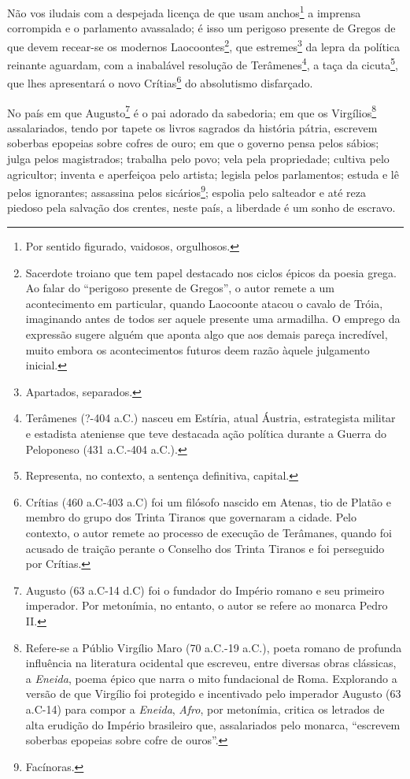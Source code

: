 Não vos iludais com a despejada licença de que usam anchos\footnote{
  Por sentido figurado, vaidosos, orgulhosos.} a imprensa corrompida e o
parlamento avassalado; é isso um perigoso presente de Gregos de que
devem recear-se os modernos Laocoontes\footnote{Sacerdote troiano que
  tem papel destacado nos ciclos épicos da poesia grega. Ao falar do
  ``perigoso presente de Gregos'', o autor remete a um acontecimento em
  particular, quando Laocoonte atacou o cavalo de Tróia, imaginando
  antes de todos ser aquele presente uma armadilha. O emprego da
  expressão sugere alguém que aponta algo que aos demais pareça
  incredível, muito embora os acontecimentos futuros deem razão àquele
  julgamento inicial.}, que estremes\footnote{Apartados, separados.}
da lepra da política reinante aguardam, com a inabalável resolução de
Terâmenes\footnote{Terâmenes (?-404 a.C.) nasceu em Estíria, atual
  Áustria, estrategista militar e estadista ateniense que teve destacada
  ação política durante a Guerra do Peloponeso (431 a.C.-404 a.C.).}, a
taça da cicuta\footnote{Representa, no contexto, a sentença
  definitiva, capital.}, que lhes apresentará o novo Crítias\footnote{
  Crítias (460 a.C-403 a.C) foi um filósofo nascido em Atenas, tio de
  Platão e membro do grupo dos Trinta Tiranos que governaram a cidade.
  Pelo contexto, o autor remete ao processo de execução de Terâmanes,
  quando foi acusado de traição perante o Conselho dos Trinta Tiranos e
  foi perseguido por Crítias.} do absolutismo disfarçado.

No país em que Augusto\footnote{Augusto (63 a.C-14 d.C) foi o fundador
  do Império romano e seu primeiro imperador. Por metonímia, no entanto,
  o autor se refere ao monarca Pedro II.} é o pai adorado da sabedoria;
em que os Virgílios\footnote{Refere-se a Públio Virgílio Maro (70
  a.C.-19 a.C.), poeta romano de profunda influência na literatura
  ocidental que escreveu, entre diversas obras clássicas, a
  \emph{Eneida}, poema épico que narra o mito fundacional de Roma.
  Explorando a versão de que Virgílio foi protegido e incentivado pelo
  imperador Augusto (63 a.C-14) para compor a \emph{Eneida},
  \emph{Afro}, por metonímia, critica os letrados de alta erudição do
  Império brasileiro que, assalariados pelo monarca, ``escrevem soberbas
  epopeias sobre cofre de ouros''.} assalariados, tendo por tapete os
livros sagrados da história pátria, escrevem soberbas epopeias sobre
cofres de ouro; em que o governo pensa pelos sábios; julga pelos
magistrados; trabalha pelo povo; vela pela propriedade; cultiva pelo
agricultor; inventa e aperfeiçoa pelo artista; legisla pelos
parlamentos; estuda e lê pelos ignorantes; assassina pelos
sicários\footnote{Facínoras.}; espolia pelo salteador e até reza
piedoso pela salvação dos crentes, neste país, a liberdade é um sonho de
escravo.

